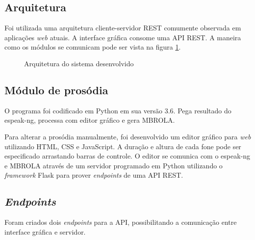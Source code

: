 \subsection{Arquitetura}
Foi utilizada uma arquitetura cliente-servidor REST \cite{rest} comumente observada em aplicações \emph{web} atuais. A interface gráfica consome uma API REST. A maneira como os
módulos se comunicam pode ser vista na figura \ref{fig:arch}.

\begin{figure}[!htbp]
\centering
{}
\caption{Arquitetura do sistema desenvolvido}
\label{fig:arch}
\end{figure}

\subsection{Módulo de prosódia}

O programa foi codificado em Python em sua versão 3.6. Pega resultado do espeak-ng, processa com editor gráfico e gera MBROLA.

Para alterar a prosódia manualmente, foi desenvolvido um editor gráfico
para \emph{web} utilizando HTML, CSS e JavaScript. A duração e altura de cada
fone pode ser especificado arrastando barras de controle. O editor se comunica
com o espeak-ng e MBROLA através de um servidor programado em Python utilizando
o \emph{framework} Flask para prover \emph{endpoints} de uma API REST.

\subsection{\emph{Endpoints}}
Foram criados dois \emph{endpoints} para a API, possibilitando a comunicação entre
interface gráfica e servidor.

